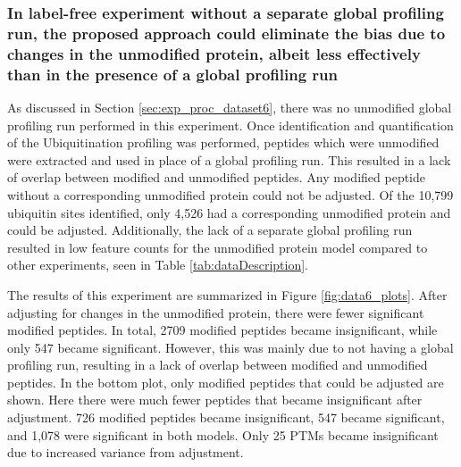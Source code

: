 \documentclass[mcp]{article}
\numberwithin{table}{section}
\begin{document}
\subsubsection*{In label-free experiment without a separate global profiling run, the proposed approach could eliminate the bias due to changes in the unmodified protein, albeit less effectively than in the presence of a global profiling run}

As discussed in Section \ref{sec:exp_proc_dataset6}, there was no unmodified global profiling run performed in this experiment. Once identification and quantification of the Ubiquitination profiling was performed, peptides which were unmodified were extracted and used in place of a global profiling run. This resulted in a lack of overlap between modified and unmodified peptides. Any modified peptide without a corresponding unmodified protein could not be adjusted. Of the 10,799 ubiquitin sites identified, only 4,526 had a corresponding unmodified protein and could be adjusted. Additionally, the lack of a separate global profiling run resulted in low feature counts for the unmodified protein model compared to other experiments, seen in Table \ref{tab:dataDescription}.

The results of this experiment are summarized in Figure \ref{fig:data6_plots}. After adjusting for changes in the unmodified protein, there were fewer significant modified peptides. In total, 2709 modified peptides became insignificant, while only 547 became significant. However, this was mainly due to not having a global profiling run, resulting in a lack of overlap between modified and unmodified peptides. In the bottom plot, only modified peptides that could be adjusted are shown. Here there were much fewer peptides that became insignificant after adjustment. 726 modified peptides became insignificant, 547 became significant, and 1,078 were significant in both models. Only 25 PTMs became insignificant due to increased variance from adjustment.

\end{document}
